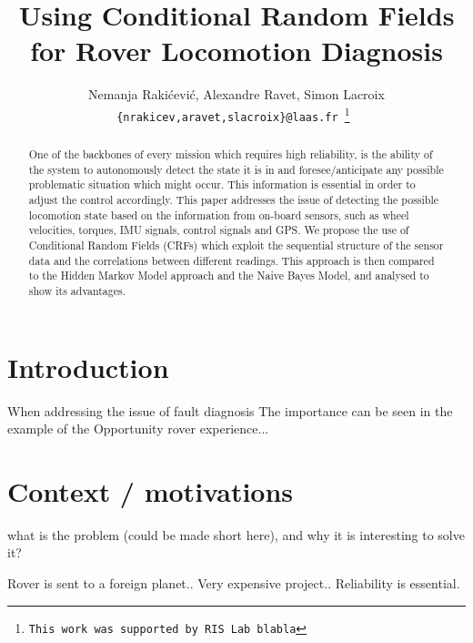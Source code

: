 \documentclass[a4paper, 10pt, conference]{ieeeconf}
\title{\LARGE \bf Using Conditional Random Fields for Rover Locomotion Diagnosis}
\author{Nemanja Raki\'{c}evi\'{c}, Alexandre Ravet, Simon Lacroix \\
\tt\small \{nrakicev,aravet,slacroix\}@laas.fr
\thanks{This work was supported by RIS Lab blabla}%
}
\begin{document}
\maketitle
\thispagestyle{empty}
\pagestyle{empty}


\begin{abstract}
One of the backbones of every mission which requires high reliability, is the ability of the system to autonomously detect the state it is in and foresee/anticipate any possible problematic situation which might occur. This information is essential in order to adjust the control accordingly. This paper addresses the issue of detecting the possible locomotion state based on the information from on-board sensors, such as wheel velocities, torques, IMU signals, control signals and GPS. We propose the use of Conditional Random Fields (CRFs) 
which exploit the sequential structure of the sensor data and the correlations between different readings. This approach is then compared to the Hidden Markov Model approach and the Naive Bayes Model, and analysed to show its advantages. \par
\end{abstract}


\section{Introduction}
When addressing the issue of fault diagnosis
The importance can be seen in the example of the Opportunity rover experience...

\par



\section{Context / motivations}

\begin{itshape}what is the problem (could be made short here), and why it is interesting to solve it?
\end{itshape}

Rover is sent to a foreign planet.. Very expensive project.. Reliability is essential.



\end{document}
